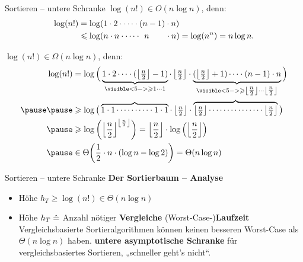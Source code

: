 \begin{frame}{Sortieren – untere Schranke}
	$\log(n!) \in O(n\log n)$, denn: 
	\pause
	\begin{align*}
		\log(n!) &= \log(1 \cdot 2 \cdot \cdots \cdot (n-1) \cdot n) \\
				 &\leq \log(n \cdot n \cdot \cdots \cdot \hphantom{(} n \hphantom{{\!}-1)} \cdot n) = \log(n^n) = n\log n.
	\end{align*}
	\pause
	
	$\log(n!) \in \Omega(n\log n)$, denn:
	\pause
	\begin{align*}
		\log(n!) 
		&= \log \Big( 
		\underbrace{1 \cdot 2 \cdots \cdot ( 
			\floor{\tfrac{n}{2}} - 1
			)}_{\visible<5->{\geq 1 \cdots 1}}     \cdot \floor{\tfrac{n}{2}} \cdot     \underbrace{( 
			\floor{\tfrac{n}{2}} + 1
			)  \cdots \cdot (n-1 ) \cdot n }_{\visible<5->{\geq \floor{\tfrac{n}{2}} \cdots \floor{\tfrac{n}{2}}}}
		\Big) \\
		\pause\pause
		&\geq \log \big( \overbrace{1 \cdot 1 \cdots\cdots\cdots\cdot 1 \cdot 1}      \cdot \floor{\tfrac{n}{2}} \cdot     \overbrace{\floor{\tfrac{n}{2}}  \cdots \cdots \cdots\cdots\cdots \floor{\tfrac{n}{2}} } \big) \\
		\pause
		& \geq \log\left(\floor{\frac{n}{2}}^{\floor{\frac{n}{2}}}\right) = \floor{\frac{n}{2}} \cdot \log\left(\floor{\frac{n}{2}}\right) \\ 
		\pause
		& \in \Th{\frac{1}{2} \cdot n \cdot (\log n - \log 2 )} = \Theta(n \log n)
	\end{align*}
\end{frame}

\begin{frame}{Sortieren – untere Schranke}
\textbf{Der Sortierbaum -- Analyse}
\begin{itemize}
	\item Höhe $h_T \geq \log(n!) \in \Theta(n \log n)$ 
	\item Höhe $h_T \mathrel{\hat{=}}$ Anzahl nötiger \textbf{Vergleiche} \entspr (Worst-Case-)\textbf{Laufzeit}
	\Implitem Vergleichsbasierte Sortieralgorithmen können keinen besseren Worst-Case als $\Theta(n\log n)$ haben.
	\implitem \textbf{untere asymptotische Schranke} für vergleichsbasiertes Sortieren, „schneller geht's nicht“. \quad\qedsymbol
\end{itemize}
\end{frame}

%		
%		

